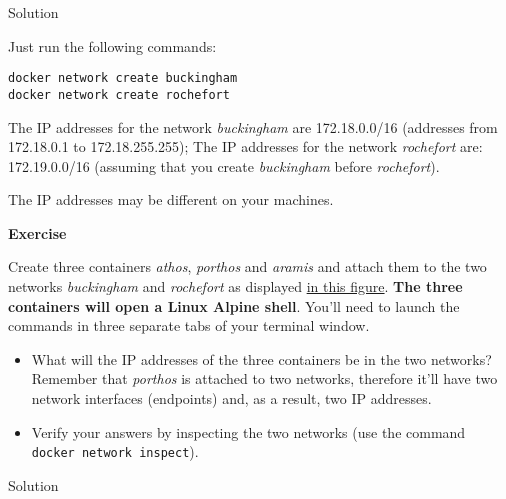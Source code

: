 \documentclass[
]{article}
\providecommand{\tightlist}{%
  \setlength{\itemsep}{0pt}\setlength{\parskip}{0pt}}
\newenvironment{infobox}[1]
  {
  \begin{itemize}
  \renewcommand{\labelitemi}{
    \raisebox{-.7\height}[0pt][0pt]{
      
    }
  }
  \setlength{\fboxsep}{1em}
  \begin{whitebox}
  \item
  }
  {
  \end{whitebox}
  \end{itemize}
  }
\theoremstyle{definition}
\theoremstyle{definition}
\theoremstyle{definition}
\theoremstyle{remark}
\let\BeginKnitrBlock\begin \let\EndKnitrBlock\end
\begin{document}
Solution

\begin{infobox}{exercisebox}

Just run the following commands:

\begin{verbatim}
docker network create buckingham
docker network create rochefort
\end{verbatim}

The IP addresses for the network \emph{buckingham} are
172.18.0.0/16 (addresses from 172.18.0.1 to 172.18.255.255);
The IP addresses for the network \emph{rochefort} are:
172.19.0.0/16 (assuming that you create \emph{buckingham}
before \emph{rochefort}).

The IP addresses may be different on your machines.

\end{infobox}

\begin{infobox}{exercisebox}

\textbf{Exercise}

\BeginKnitrBlock{exercise}
\protect\hypertarget{exr:unnamed-chunk-35}{}{\label{exr:unnamed-chunk-35} }Create three containers \emph{athos}, \emph{porthos} and \emph{aramis} and attach them
to the two networks \emph{buckingham} and \emph{rochefort} as displayed
\href{/courses/cloud-computing/docker-primer\#fig:cnm}{in this figure}.
\textbf{The three containers will open a Linux Alpine shell}.
You'll need to launch the commands in three separate tabs of your terminal window.

\begin{itemize}
\tightlist
\item
  What will the IP addresses of the three containers be in the two networks?
  Remember that \emph{porthos} is attached to two networks, therefore it'll have two
  network interfaces (endpoints) and, as a result, two IP addresses.
\end{itemize}

\begin{itemize}
\tightlist
\item
  Verify your answers by inspecting the two networks (use the
  command \texttt{docker\ network\ inspect}).
\end{itemize}
\EndKnitrBlock{exercise}

\end{infobox}

Solution
\end{document}
